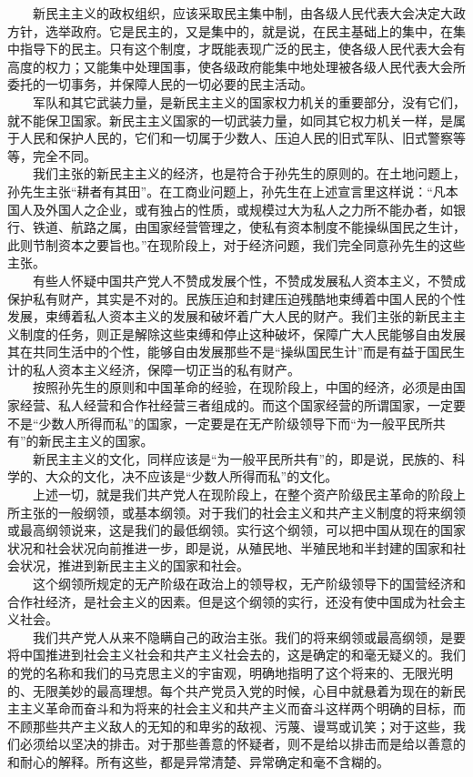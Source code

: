 \documentclass[cn,11pt,chinese]{elegantbook}
\begin{document}
　　新民主主义的政权组织，应该采取民主集中制，由各级人民代表大会决定大政方针，选举政府。它是民主的，又是集中的，就是说，在民主基础上的集中，在集中指导下的民主。只有这个制度，才既能表现广泛的民主，使各级人民代表大会有高度的权力；又能集中处理国事，使各级政府能集中地处理被各级人民代表大会所委托的一切事务，并保障人民的一切必要的民主活动。\\
　　军队和其它武装力量，是新民主主义的国家权力机关的重要部分，没有它们，就不能保卫国家。新民主主义国家的一切武装力量，如同其它权力机关一样，是属于人民和保护人民的，它们和一切属于少数人、压迫人民的旧式军队、旧式警察等等，完全不同。\\
　　我们主张的新民主主义的经济，也是符合于孙先生的原则的。在土地问题上，孙先生主张“耕者有其田”。在工商业问题上，孙先生在上述宣言里这样说：“凡本国人及外国人之企业，或有独占的性质，或规模过大为私人之力所不能办者，如银行、铁道、航路之属，由国家经营管理之，使私有资本制度不能操纵国民之生计，此则节制资本之要旨也。”在现阶段上，对于经济问题，我们完全同意孙先生的这些主张。\\
　　有些人怀疑中国共产党人不赞成发展个性，不赞成发展私人资本主义，不赞成保护私有财产，其实是不对的。民族压迫和封建压迫残酷地束缚着中国人民的个性发展，束缚着私人资本主义的发展和破坏着广大人民的财产。我们主张的新民主主义制度的任务，则正是解除这些束缚和停止这种破坏，保障广大人民能够自由发展其在共同生活中的个性，能够自由发展那些不是“操纵国民生计”而是有益于国民生计的私人资本主义经济，保障一切正当的私有财产。\\
　　按照孙先生的原则和中国革命的经验，在现阶段上，中国的经济，必须是由国家经营、私人经营和合作社经营三者组成的。而这个国家经营的所谓国家，一定要不是“少数人所得而私”的国家，一定要是在无产阶级领导下而“为一般平民所共有”的新民主主义的国家。\\
　　新民主主义的文化，同样应该是“为一般平民所共有”的，即是说，民族的、科学的、大众的文化，决不应该是“少数人所得而私”的文化。\\
　　上述一切，就是我们共产党人在现阶段上，在整个资产阶级民主革命的阶段上所主张的一般纲领，或基本纲领。对于我们的社会主义和共产主义制度的将来纲领或最高纲领说来，这是我们的最低纲领。实行这个纲领，可以把中国从现在的国家状况和社会状况向前推进一步，即是说，从殖民地、半殖民地和半封建的国家和社会状况，推进到新民主主义的国家和社会。\\
　　这个纲领所规定的无产阶级在政治上的领导权，无产阶级领导下的国营经济和合作社经济，是社会主义的因素。但是这个纲领的实行，还没有使中国成为社会主义社会。\\
　　我们共产党人从来不隐瞒自己的政治主张。我们的将来纲领或最高纲领，是要将中国推进到社会主义社会和共产主义社会去的，这是确定的和毫无疑义的。我们的党的名称和我们的马克思主义的宇宙观，明确地指明了这个将来的、无限光明的、无限美妙的最高理想。每个共产党员入党的时候，心目中就悬着为现在的新民主主义革命而奋斗和为将来的社会主义和共产主义而奋斗这样两个明确的目标，而不顾那些共产主义敌人的无知的和卑劣的敌视、污蔑、谩骂或讥笑；对于这些，我们必须给以坚决的排击。对于那些善意的怀疑者，则不是给以排击而是给以善意的和耐心的解释。所有这些，都是异常清楚、异常确定和毫不含糊的。\\
\end{document}
